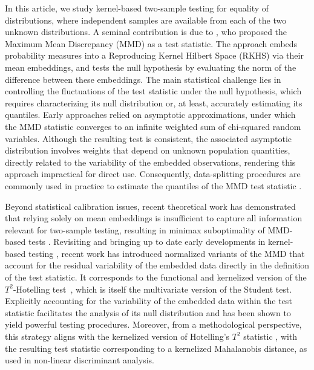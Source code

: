 \documentclass[twoside,11pt]{article}
\begin{document}
In this article, we study kernel-based two-sample testing for equality of distributions, where independent samples are available from each of the two unknown distributions. A seminal contribution is due to \cite{gretton2006kernel,gretton2012kernel}, who proposed the Maximum Mean Discrepancy (MMD) as a test statistic. The approach embeds probability measures into a Reproducing Kernel Hilbert Space (RKHS) via their mean embeddings, and tests the null hypothesis by evaluating the norm of the difference between these embeddings. The main statistical challenge lies in controlling the fluctuations of the test statistic under the null hypothesis, which requires characterizing its null distribution or, at least, accurately estimating its quantiles. Early approaches relied on asymptotic approximations, under which the MMD statistic converges to an infinite weighted sum of chi-squared random variables. Although the resulting test is consistent, the associated asymptotic distribution involves weights that depend on unknown population quantities, directly related to the variability of the embedded observations, rendering this approach impractical for direct use. Consequently, data-splitting procedures are commonly used in practice to estimate the quantiles of the MMD test statistic \citep{fromont2012kernels,Chwialkowski2014wild,schrab2023mmd}.

Beyond statistical calibration issues, recent theoretical work has demonstrated that relying solely on mean embeddings is insufficient to capture all information relevant for two-sample testing, resulting in minimax suboptimality of MMD-based tests \citep{hagrass2024spectral,li2024optimality,schrab2023mmd}. Revisiting and bringing up to date early developments in kernel-based testing \citep{eric2007testing}, recent work has introduced normalized variants of the MMD that account for the residual variability of the embedded data directly in the definition of the test statistic. It corresponds to the functional and kernelized version of the $T^2$-Hotelling test~\citep{hotelling1931generalization}, which is itself the multivariate version of the Student test. Explicitly accounting for the variability of the embedded data within the test statistic facilitates the analysis of its null distribution and has been shown to yield powerful testing procedures. Moreover, from a methodological perspective, this strategy aligns with the kernelized version of Hotelling’s $T^2$ statistic \citep{lehmann1986testing}, with the resulting test statistic corresponding to a kernelized Mahalanobis distance, as used in non-linear discriminant analysis.
\end{document}
